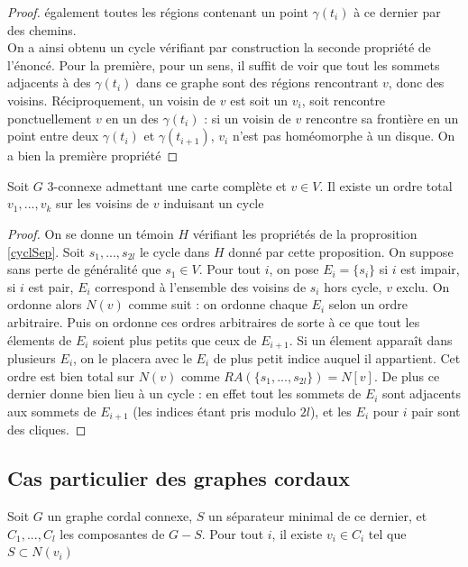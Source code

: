 \documentclass{scrartcl}
\begin{document}
\begin{flushleft}
\begin{proof}
    également toutes les régions contenant un point $\gamma(t_i)$ à ce dernier par des chemins.\\
    On a ainsi obtenu un cycle vérifiant par construction la seconde propriété de l'énoncé. Pour la première, pour un sens,
    il suffit de voir que tout les sommets adjacents à des $\gamma(t_i)$ dans ce graphe sont des régions rencontrant $v$, donc des
    voisins. Réciproquement, un voisin de $v$ est soit un $v_i$, soit rencontre ponctuellement $v$ en un des $\gamma(t_i)$ : si un
    voisin de $v$ rencontre sa frontière en un point entre deux $\gamma(t_i)$ et $\gamma(t_{i+1})$, $v_i$ n'est pas homéomorphe à
    un disque. On a bien la première propriété
\end{proof}

\begin{cor}\label{ordCycl}
    Soit $G$ $3$-connexe admettant une carte complète et $v \in V$. Il existe un ordre total $v_1, ..., v_k$ sur les voisins de $v$
    induisant un cycle
\end{cor}

\begin{proof}
    On se donne un témoin $H$ vérifiant les propriétés de la proprosition \ref{cyclSep}. Soit $s_1, ..., s_{2l}$ le cycle dans $H$
    donné par cette proposition. On suppose sans perte de généralité que $s_1 \in V$. Pour tout $i$, on pose $E_i = \{s_i\}$
    si $i$ est impair, si $i$ est pair, $E_i$ correspond à l'ensemble des voisins de $s_i$ hors cycle, $v$ exclu. On ordonne alors $N(v)$
    comme suit : on ordonne chaque $E_i$ selon un ordre arbitraire. Puis on ordonne ces ordres arbitraires de sorte à ce que
    tout les élements de $E_i$ soient plus petits que ceux de $E_{i+1}$. Si un élement apparaît dans plusieurs $E_i$, on le placera avec
    le $E_i$ de plus petit indice auquel il appartient. Cet ordre est bien total sur $N(v)$
    comme $RA(\{s_1, ..., s_{2l}\}) = N[v]$. De plus ce dernier donne bien lieu à un cycle : en effet tout les sommets de $E_i$ sont
    adjacents aux sommets de $E_{i+1}$ (les indices étant pris modulo $2l$), et les $E_i$ pour $i$ pair sont des cliques.
\end{proof}

\subsection{Cas particulier des graphes cordaux}

\begin{lem}
    Soit $G$ un graphe cordal connexe, $S$ un séparateur minimal de ce dernier, et $C_1, ..., C_l$ les composantes de $G - S$. Pour tout
    $i$, il existe $v_i \in C_i$ tel que $S \subset N(v_i)$
\end{lem}


\end{flushleft}
\end{document}
